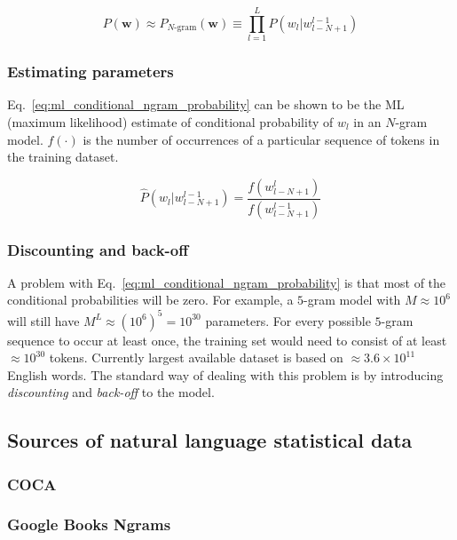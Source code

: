\documentclass{IIBproject}
\begin{document}
\begin{equation}
\label{eq:ngram_string_probability}
P(\mathbf w) \approx P_{\text{$N$-gram}}(\mathbf w) \equiv \prod_{l=1}^{L} P( w_l | w_{l-N+1}^{l-1} )
\end{equation}

\subsubsection{Estimating parameters}

Eq.~\ref{eq:ml_conditional_ngram_probability} can be shown to be the ML (maximum likelihood) estimate of conditional probability of $w_l$ in an $N$-gram model. $f(\cdot)$ is the number of occurrences of a particular sequence of tokens in the training dataset.

\begin{equation}
\label{eq:ml_conditional_ngram_probability}
\hat P( w_l | w_{l-N+1}^{l-1} ) = \frac {f(w_{l-N+1}^l)} {f(w_{l-N+1}^{l-1})}
\end{equation}

\subsubsection{Discounting and back-off}

A problem with Eq.~\ref{eq:ml_conditional_ngram_probability} is that most of the conditional probabilities will be zero. For example, a $5$-gram model with $M \approx 10^6$ will still have $M^L \approx \left( 10^6 \right)^5 = 10^{30}$ parameters. For every possible $5$-gram sequence to occur at least once, the training set would need to consist of at least $\approx 10^{30}$ tokens. Currently largest available dataset is based on $\approx 3.6 \times 10^{11}$ English words. \cite{googlengrams2011} The standard way of dealing with this problem is by introducing \emph{discounting} and \emph{back-off} to the model.

\subsection{Sources of natural language statistical data}

\subsubsection{COCA}

\subsubsection{Google Books Ngrams}
\end{document}
